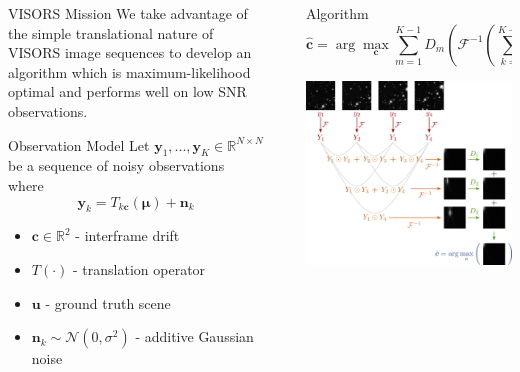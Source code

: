 \documentclass[final]{beamer}
\newlength{\sepwidth}
\newlength{\colwidth}
\newcommand{\separatorcolumn}{\begin{column}{\sepwidth}\end{column}}
\begin{document}
\begin{frame}[t]
\begin{columns}[t]
\begin{column}{\colwidth}
\begin{block}{ VISORS Mission}
    We take advantage of the simple translational nature of VISORS image sequences to develop an algorithm which is maximum-likelihood optimal and performs well on low SNR observations.

  \end{block}

  \begin{block}{Observation Model}
      Let $\bm{y}_1, ..., \bm{y}_K \in \mathbb{R}^{N \times N}$ be a sequence of noisy observations where
      $$\bm{y}_k = T_{k\bm{c}}(\bm{\mu}) + \bm{n}_k$$
      \vspace*{-2cm}
      \begin{itemize}
        \item $\bm{c} \in \mathbb{R}^2$ - interframe drift
        \item $T(\cdot)$ - translation operator
        \item $\bm{u}$ - ground truth scene
        \item $\bm{n}_k \sim \mathcal{N}(0, \sigma^2)$ - additive Gaussian noise
      \end{itemize}
  \end{block}

\end{column}

\separatorcolumn


\begin{column}{\colwidth}


  \begin{block}{Algorithm}
    $$
    \hat{\bm{c}} = \arg\max_{\bm{c}} \sum_{m=1}^{K-1} D_m \left(
    \mathcal{F}^{-1} \left( \sum_{k=1}^{K-m} \bm{Y}_k \odot \bm{Y}_{k+m} \right)
    \right)[\bm{c}]
    $$
    \begin{center}
    \includegraphics[width=0.9 \textwidth]{figures/algorithm.png}
    \end{center}
  \end{block}


\end{column}
\end{columns}
\end{frame}
\end{document}
